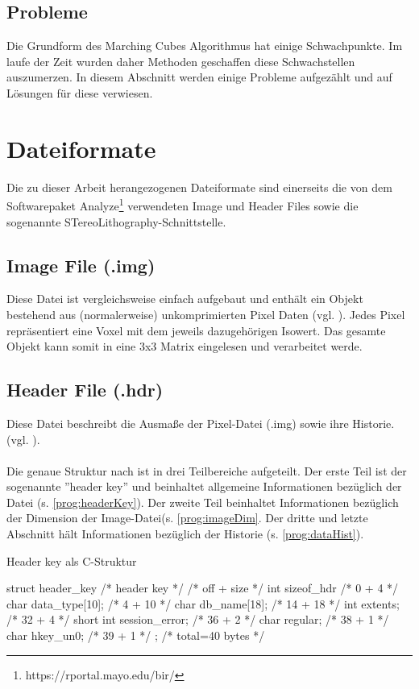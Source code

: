 \subsection{Probleme}
Die Grundform des Marching Cubes Algorithmus hat einige Schwachpunkte. Im laufe der Zeit wurden daher Methoden geschaffen diese Schwachstellen auszumerzen. In diesem Abschnitt werden einige Probleme aufgezählt und auf Lösungen für diese verwiesen.\\

\section{Dateiformate}
\label{sec:DateiEinf}
Die zu dieser Arbeit herangezogenen Dateiformate sind einerseits die von dem Softwarepaket Analyze\footnote{https://rportal.mayo.edu/bir/} verwendeten Image und Header Files sowie die sogenannte STereoLithography-Schnittstelle. 

\subsection{Image File (.img)}
Diese Datei ist vergleichsweise einfach aufgebaut und enthält ein Objekt bestehend aus (normalerweise) unkomprimierten Pixel Daten (vgl. \citep{AnalyzeFormat}). Jedes Pixel repräsentiert eine Voxel mit dem jeweils dazugehörigen Isowert. Das gesamte Objekt kann somit in eine 3x3 Matrix eingelesen und verarbeitet werde.

\subsection{Header File (.hdr)}
\label{sec:DateiHead}
Diese Datei beschreibt die Ausmaße der Pixel-Datei (.img) sowie ihre Historie. (vgl. \citep{AnalyzeFormat}). \\\\
Die genaue Struktur nach \citep{AnalyzeFormat} ist in drei Teilbereiche aufgeteilt. Der erste Teil ist der sogenannte ''header key'' und beinhaltet allgemeine Informationen bezüglich der Datei (s. \ref{prog:headerKey}). Der zweite Teil beinhaltet Informationen bezüglich der Dimension der Image-Datei(s. \ref{prog:imageDim}. Der dritte und letzte Abschnitt hält Informationen bezüglich der Historie (s. \ref{prog:dataHist}).

\begin{program}[H]
	\caption{Header key als C-Struktur \citep{AnalyzeFormat}}
	\label{prog:headerKey}
	\begin{CCode}
struct header_key /* header key */
{ /* off + size */
	int sizeof_hdr /* 0 + 4 */
	char data_type[10]; /* 4 + 10 */
	char db_name[18]; /* 14 + 18 */
	int extents; /* 32 + 4 */
	short int session_error; /* 36 + 2 */
	char regular; /* 38 + 1 */
	char hkey_un0; /* 39 + 1 */
}; /* total=40 bytes */ 
	\end{CCode}
\end{program}

